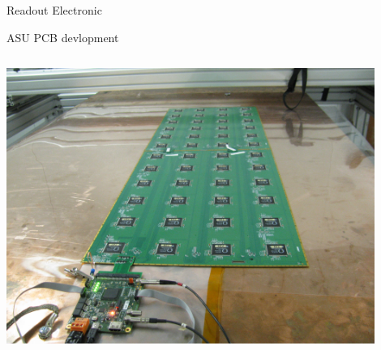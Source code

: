 \documentclass[10pt]{beamer}
\begin{document}
\begin{frame}[shrink=3]{Readout Electronic}
\begin{block}{ASU PCB devlopment}
\begin{columns}
      \begin{column}{0.5\textwidth}
        \centerline{\includegraphics[width=0.9\textwidth]{jpg/DIFAsu}}
      \end{column}

    \end{columns}
  \end{block}
\end{frame}
\end{document}
